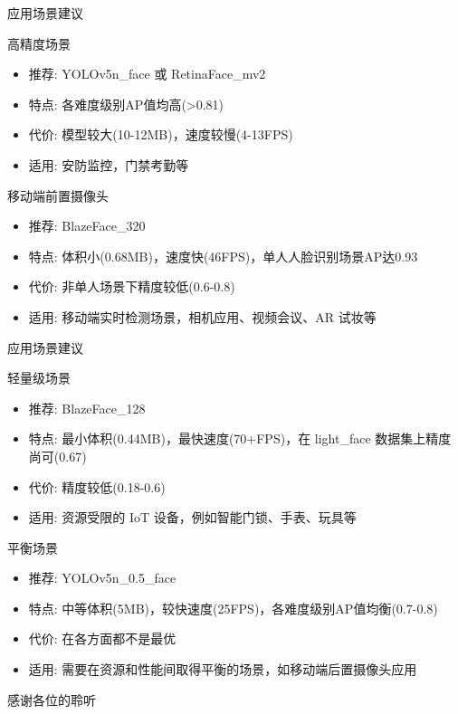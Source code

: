 \documentclass{beamer}
\begin{document}
\begin{frame}{应用场景建议}
    \begin{block}{高精度场景}
        \begin{itemize}
            \footnotesize
            \item 推荐: YOLOv5n\_face 或 RetinaFace\_mv2
            \item 特点: 各难度级别AP值均高(>0.81)
            \item 代价: 模型较大(10-12MB)，速度较慢(4-13FPS)
            \item 适用: 安防监控，门禁考勤等
        \end{itemize}
    \end{block}

    \begin{block}{移动端前置摄像头}
        \begin{itemize}
            \footnotesize
            \item 推荐: BlazeFace\_320
            \item 特点: 体积小(0.68MB)，速度快(46FPS)，单人人脸识别场景AP达0.93
            \item 代价: 非单人场景下精度较低(0.6-0.8)
            \item 适用: 移动端实时检测场景，相机应用、视频会议、AR 试妆等
        \end{itemize}
    \end{block}
\end{frame}


\begin{frame}{应用场景建议}
    \begin{block}{轻量级场景}
        \begin{itemize}
            \footnotesize
            \item 推荐: BlazeFace\_128
            \item 特点: 最小体积(0.44MB)，最快速度(70+FPS)，在 light\_face 数据集上精度尚可(0.67)
            \item 代价: 精度较低(0.18-0.6)
            \item 适用: 资源受限的 IoT 设备，例如智能门锁、手表、玩具等
        \end{itemize}
    \end{block}
    \begin{block}{平衡场景}
        \begin{itemize}
            \footnotesize
            \item 推荐: YOLOv5n\_0.5\_face
            \item 特点: 中等体积(5MB)，较快速度(25FPS)，各难度级别AP值均衡(0.7-0.8)
            \item 代价: 在各方面都不是最优
            \item 适用: 需要在资源和性能间取得平衡的场景，如移动端后置摄像头应用
        \end{itemize}
    \end{block}
\end{frame}

\begin{frame}
    \begin{center}
        {\Huge\calligra 感谢各位的聆听}
    \end{center}
\end{frame}
\end{document}
